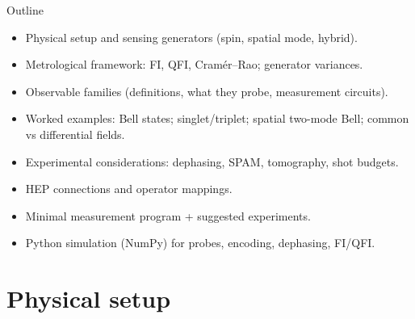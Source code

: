 \documentclass[aspectratio=169]{beamer}
\begin{document}
\begin{frame}{Outline}
\small
\begin{itemize}
\item Physical setup and sensing generators (spin, spatial mode, hybrid).
\item Metrological framework: FI, QFI, Cram\'er--Rao; generator variances.
\item Observable families (definitions, what they probe, measurement circuits).
\item Worked examples: Bell states; singlet/triplet; spatial two-mode Bell; common vs differential fields.
\item Experimental considerations: dephasing, SPAM, tomography, shot budgets.
\item HEP connections and operator mappings.
\item Minimal measurement program + suggested experiments.
\item Python simulation (NumPy) for probes, encoding, dephasing, FI/QFI.
\end{itemize}
\end{frame}

\section{Physical setup}
\end{document}
